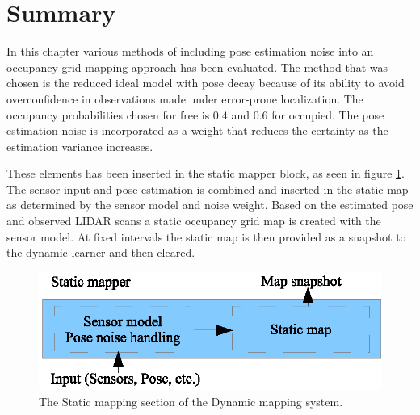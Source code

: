 \section{Summary}
In this chapter various methods of including pose estimation noise into an occupancy grid mapping approach has been evaluated. 
The method that was chosen is the reduced ideal model with pose decay because of its ability to avoid overconfidence in observations made under error-prone localization. 
The occupancy probabilities chosen for free is \(0.4\) and \(0.6\) for occupied. The pose estimation noise is incorporated as a weight that reduces the certainty as the estimation variance increases.  

These elements has been inserted in the static mapper block, as seen in figure \ref{fig:static_map_detail}. 
The sensor input and pose estimation is combined and inserted in the static map as determined by the sensor model and noise weight.
Based on the estimated pose and observed LIDAR scans a static occupancy grid map is created with the sensor model. 
At fixed intervals the static map is then provided as a snapshot to the dynamic learner and then cleared. 

\begin{figure}[htbp]
	\centering
	\includegraphics[scale=1]{chapters/static_mapping/figures/static_map_detail.eps}
	\caption{The Static mapping section of the Dynamic mapping system.}
	\label{fig:static_map_detail}
\end{figure}

